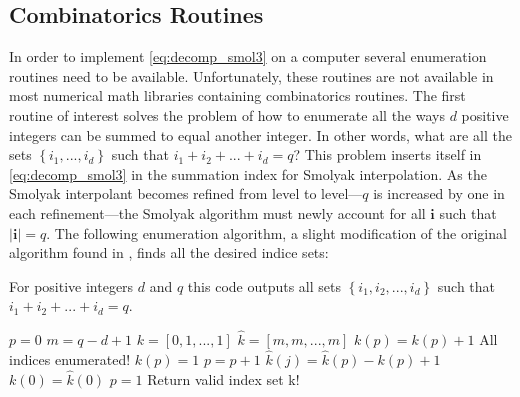 \subsection{Combinatorics Routines} \label{subsec:combinatorics_routines}

In order to implement \ref{eq:decomp_smol3} on a computer several enumeration routines need to be available. Unfortunately, these routines are not available in most numerical math libraries containing combinatorics routines. The first routine of interest solves the problem of how to enumerate all the ways $d$ positive integers can be summed to equal another integer. In other words, what are all the sets $\left\{i_1,...,i_d\right\}$ such that $i_1 + i_2 + ... + i_d = q$? This problem inserts itself in \ref{eq:decomp_smol3} in the summation index for Smolyak interpolation. As the Smolyak interpolant becomes refined from level to level---$q$ is increased by one in each refinement---the Smolyak algorithm must newly account for all $\textbf{i}$ such that $\vert\textbf{i}\vert=q$. The following enumeration algorithm, a slight modification of the original algorithm found in \cite{Holtz}, finds all the desired indice sets:        
\begin{algorithm}
\caption{\label{code:enumeration1} 
For positive integers $d$ and $q$ this code outputs all sets $\left\{i_1,i_2,...,i_d\right\}$ such that $i_1+i_2+...+i_d=q$.} 
\begin{algorithmic}[1]
\State $p = 0$
\State $m = q - d + 1$ 
\State $k = \left[0,1,...,1\right]$   
\State $\hat{k} = \left[m,m,...,m\right]$  
\Repeat 
   \State $k(p) = k(p) + 1$
         \State All indices enumerated!
      \Else
         \State $k(p) = 1$
         \State $p = p + 1$ 
      \EndIf
   \Else
         \State $\hat{k}(j) = \hat{k}(p) - k(p) + 1$
      \EndFor
      \State $k(0) = \hat{k}(0)$
      \State $p = 1$
      \State Return valid index set k!
   \EndIf
{}
\end{algorithmic}
\end{algorithm}

